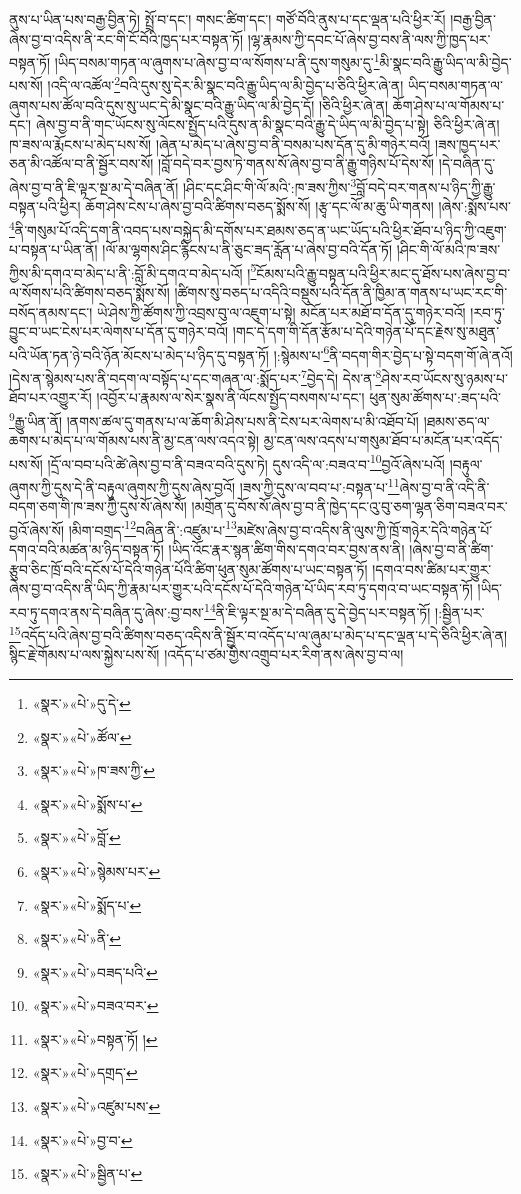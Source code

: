 ནུས་པ་ཡིན་པས་བརྒྱ་བྱིན་ཏེ། སྤྲོ་བ་དང་། གསང་ཚིག་དང་། གཙོ་བོའི་ནུས་པ་དང་ལྡན་པའི་ཕྱིར་རོ། །བརྒྱ་བྱིན་ཞེས་བྱ་བ་འདིས་ནི་རང་གི་ངོ་བོའི་ཁྱད་པར་བསྟན་ཏོ། །ལྷ་རྣམས་ཀྱི་དབང་པོ་ཞེས་བྱ་བས་ནི་ལས་ཀྱི་ཁྱད་པར་བསྟན་ཏོ། །ཡིད་བསམ་གཏན་ལ་ཞུགས་པ་ཞེས་བྱ་བ་ལ་སོགས་པ་ནི་དུས་གསུམ་དུ་\footnote{«སྣར་»«པེ་»དུ་དེ་}མི་སྣང་བའི་རྒྱུ་ཡིད་ལ་མི་བྱེད་པས་སོ། །འདི་ལ་འཚོལ་\footnote{«སྣར་»«པེ་»ཚོལ་}བའི་དུས་སུ་དེར་མི་སྣང་བའི་རྒྱུ་ཡིད་ལ་མི་བྱེད་པ་ཅིའི་ཕྱིར་ཞེ་ན། ཡིད་བསམ་གཏན་ལ་ཞུགས་པས་ཚོལ་བའི་དུས་སུ་ཡང་དེ་མི་སྣང་བའི་རྒྱུ་ཡིད་ལ་མི་བྱེད་དོ། །ཅིའི་ཕྱིར་ཞེ་ན། ཆོག་ཤེས་པ་ལ་གོམས་པ་དང་། ཞེས་བྱ་བ་ནི་གང་ཡོངས་སུ་ལོངས་སྤྱོད་པའི་དུས་ན་མི་སྣང་བའི་རྒྱུ་དེ་ཡིད་ལ་མི་བྱེད་པ་སྟེ། ཅིའི་ཕྱིར་ཞེ་ན། ཁ་ཟས་ལ་རྨོངས་པ་མེད་པས་སོ། །ཞེན་པ་མེད་པ་ཞེས་བྱ་བ་ནི་བསམ་པས་དོན་དུ་མི་གཉེར་བའོ། །ཟས་ཁྱད་པར་ཅན་མི་འཚོལ་བ་ནི་སྦྱོར་བས་སོ། །བློ་བདེ་བར་བྱས་ཏེ་གནས་སོ་ཞེས་བྱ་བ་ནི་རྒྱུ་གཉིས་པོ་དེས་སོ། །དེ་བཞིན་དུ་ཞེས་བྱ་བ་ནི་ཇི་ལྟར་སྔ་མ་དེ་བཞིན་ནོ། །ཤིང་དང་ཤིང་གི་ལོ་མའི་:ཁ་ཟས་ཀྱིས་\footnote{«སྣར་»«པེ་»ཁ་ཟས་ཀྱི་}བློ་བདེ་བར་གནས་པ་ཉིད་ཀྱི་རྒྱུ་བསྟན་པའི་ཕྱིར། ཆོག་ཤེས་ངེས་པ་ཞེས་བྱ་བའི་ཚིགས་བཅད་སྨོས་སོ། །རྩྭ་དང་ལོ་མ་ཆུ་ཡི་གནས། །ཞེས་:སྨོས་པས་\footnote{«སྣར་»«པེ་»སྨོས་པ་}ནི་གསུམ་པོ་འདི་དག་ནི་འབད་པས་བསྐྱེད་མི་དགོས་པར་ཐམས་ཅད་ན་ཡང་ཡོད་པའི་ཕྱིར་ཐོབ་པ་ཉིད་ཀྱི་འཇུག་པ་བསྟན་པ་ཡིན་ནོ། །ལོ་མ་ལྷགས་ཤིང་རྙིངས་པ་ནི་ཅུང་ཟད་རློན་པ་ཞེས་བྱ་བའི་དོན་ཏོ། །ཤིང་གི་ལོ་མའི་ཁ་ཟས་ཀྱིས་མི་དགའ་བ་མེད་པ་ནི་:བློ་མི་དགའ་བ་མེད་པའོ། །\footnote{«སྣར་»«པེ་»བློ་}ངོམས་པའི་རྒྱུ་བསྟན་པའི་ཕྱིར་མང་དུ་ཐོས་པས་ཞེས་བྱ་བ་ལ་སོགས་པའི་ཚིགས་བཅད་སྨོས་སོ། །ཚིགས་སུ་བཅད་པ་འདིའི་བསྡུས་པའི་དོན་ནི་ཁྱིམ་ན་གནས་པ་ཡང་རང་གི་བསོད་ནམས་དང་། ཡེ་ཤེས་ཀྱི་ཚོགས་ཀྱི་འབྲས་བུ་ལ་འཇུག་པ་སྟེ། མངོན་པར་མཐོ་བ་དོན་དུ་གཉེར་བའོ། །རབ་ཏུ་བྱུང་བ་ཡང་ངེས་པར་ལེགས་པ་དོན་དུ་གཉེར་བའོ། །གང་དེ་དག་གི་དོན་རྩོམ་པ་དེའི་གཉེན་པོ་དང་རྗེས་སུ་མཐུན་པའི་ཡོན་ཏན་ཉེ་བའི་ཉོན་མོངས་པ་མེད་པ་ཉིད་དུ་བསྟན་ཏོ། །:སྙེམས་པ་\footnote{«སྣར་»«པེ་»སྙེམས་པར་}ནི་བདག་གིར་བྱེད་པ་སྟེ་བདག་གོ་ཞེ་ནའོ། །དེས་ན་སྙེམས་པས་ནི་བདག་ལ་བསྟོད་པ་དང་གཞན་ལ་:སྨོད་པར་\footnote{«སྣར་»«པེ་»སྨོད་པ་}བྱེད་དེ། དེས་ན་\footnote{«སྣར་»«པེ་»ནི་}ཤེས་རབ་ཡོངས་སུ་ཉམས་པ་ཐོབ་པར་འགྱུར་རོ། །འབྱོར་པ་རྣམས་ལ་སེར་སྣས་ནི་ལོངས་སྤྱོད་བསགས་པ་དང་། ཕུན་སུམ་ཚོགས་པ་:ཟད་པའི་\footnote{«སྣར་»«པེ་»བཟད་པའི་}རྒྱུ་ཡིན་ནོ། །ནགས་ཚལ་དུ་གནས་པ་ལ་ཆོག་མི་ཤེས་པས་ནི་ངེས་པར་ལེགས་པ་མི་འཐོབ་པོ། །ཐམས་ཅད་ལ་ཆགས་པ་མེད་པ་ལ་གོམས་པས་ནི་མྱ་ངན་ལས་འདའ་སྟེ། མྱ་ངན་ལས་འདས་པ་གསུམ་ཐོབ་པ་མངོན་པར་འདོད་པས་སོ། །དྲོ་ལ་བབ་པའི་ཚེ་ཞེས་བྱ་བ་ནི་བཟའ་བའི་དུས་ཏེ། དུས་འདི་ལ་:བཟའ་བ་\footnote{«སྣར་»«པེ་»བཟའ་བར་}བྱའོ་ཞེས་པའོ། །བརྟུལ་ཞུགས་ཀྱི་དུས་དེ་ནི་བརྟུལ་ཞུགས་ཀྱི་དུས་ཞེས་བྱའོ། །ཟས་ཀྱི་དུས་ལ་བབ་པ་:བསྟན་པ་\footnote{«སྣར་»«པེ་»བསྟན་ཏོ། །}ཞེས་བྱ་བ་ནི་འདི་ནི་བདག་ཅག་གི་ཁ་ཟས་ཀྱི་དུས་སོ་ཞེས་སོ། །མགྲོན་དུ་བོས་སོ་ཞེས་བྱ་བ་ནི་ཁྱེད་དང་འུ་བུ་ཅག་ལྷན་ཅིག་བཟའ་བར་བྱའོ་ཞེས་སོ། །མིག་བགྲད་\footnote{«སྣར་»«པེ་»དགྲད་}བཞིན་ནི་:འཛུམ་པ་\footnote{«སྣར་»«པེ་»འཛུམ་པས་}མཛེས་ཞེས་བྱ་བ་འདིས་ནི་ལུས་ཀྱི་ཁྲོ་གཉེར་དེའི་གཉེན་པོ་དགའ་བའི་མཚན་མ་ཉིད་བསྟན་ཏོ། །ཡིད་འོང་རྣར་སྙན་ཚིག་གིས་དགའ་བར་བྱས་ནས་ནི། །ཞེས་བྱ་བ་ནི་ཚིག་རྩུབ་ཅིང་ཁྲོ་བའི་དངོས་པོ་དེའི་གཉེན་པོའི་ཚིག་ཕུན་སུམ་ཚོགས་པ་ཡང་བསྟན་ཏོ། །དགའ་བས་ཚིམ་པར་གྱུར་ཞེས་བྱ་བ་འདིས་ནི་ཡིད་ཀྱི་རྣམ་པར་གྱུར་པའི་དངོས་པོ་དེའི་གཉེན་པོ་ཡིད་རབ་ཏུ་དགའ་བ་ཡང་བསྟན་ཏོ། །ཡིད་རབ་ཏུ་དགའ་ནས་དེ་བཞིན་དུ་ཞེས་:བྱ་བས་\footnote{«སྣར་»«པེ་»བྱ་བ་}ནི་ཇི་ལྟར་སྔ་མ་དེ་བཞིན་དུ་དེ་བྱེད་པར་བསྟན་ཏོ། །:སྦྱིན་པར་\footnote{«སྣར་»«པེ་»སྦྱིན་པ་}འདོད་པའི་ཞེས་བྱ་བའི་ཚིགས་བཅད་འདིས་ནི་སྦྱོར་བ་འདོད་པ་ལ་ཞུམ་པ་མེད་པ་དང་ལྡན་པ་དེ་ཅིའི་ཕྱིར་ཞེ་ན། སྙིང་རྗེ་གོམས་པ་ལས་སྐྱེས་པས་སོ། །འདོད་པ་ཙམ་གྱིས་འགྲུབ་པར་རིག་ནས་ཞེས་བྱ་བ་ལ། 